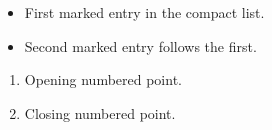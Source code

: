 \documentclass{article}
\begin{document}
\begin{itemize}[label=\textbullet, leftmargin=2em]
\item First marked entry in the compact list.
\item Second marked entry follows the first.
\end{itemize}
\begin{enumerate}[label=(\roman*), nosep]
\item Opening numbered point.
\item Closing numbered point.
\end{enumerate}
\end{document}

